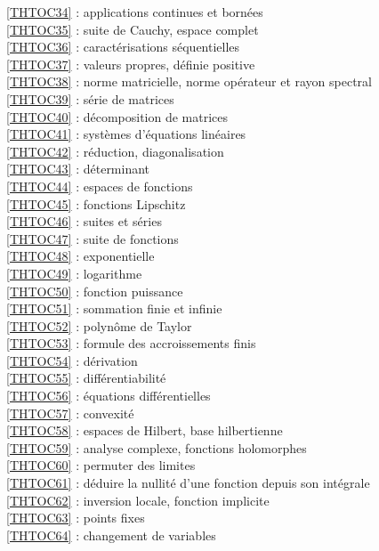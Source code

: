 \ref {THTOC34} : applications continues et bornées\\
\ref {THTOC35} : suite de Cauchy, espace complet\\
\ref {THTOC36} : caractérisations séquentielles\\
\ref {THTOC37} : valeurs propres, définie positive\\
\ref {THTOC38} : norme matricielle, norme opérateur et rayon spectral\\
\ref {THTOC39} : série de matrices\\
\ref {THTOC40} : décomposition de matrices\\
\ref {THTOC41} : systèmes d'équations linéaires\\
\ref {THTOC42} : réduction, diagonalisation\\
\ref {THTOC43} : déterminant\\
\ref {THTOC44} : espaces de fonctions\\
\ref {THTOC45} : fonctions Lipschitz\\
\ref {THTOC46} : suites et séries\\
\ref {THTOC47} : suite de fonctions\\
\ref {THTOC48} : exponentielle\\
\ref {THTOC49} : logarithme\\
\ref {THTOC50} : fonction puissance\\
\ref {THTOC51} : sommation finie et infinie\\
\ref {THTOC52} : polynôme de Taylor\\
\ref {THTOC53} : formule des accroissements finis\\
\ref {THTOC54} : dérivation\\
\ref {THTOC55} : différentiabilité\\
\ref {THTOC56} : équations différentielles\\
\ref {THTOC57} : convexité\\
\ref {THTOC58} : espaces de Hilbert, base hilbertienne\\
\ref {THTOC59} : analyse complexe, fonctions holomorphes\\
\ref {THTOC60} : permuter des limites\\
\ref {THTOC61} : déduire la nullité d'une fonction depuis son intégrale\\
\ref {THTOC62} : inversion locale, fonction implicite\\
\ref {THTOC63} : points fixes\\
\ref {THTOC64} : changement de variables\\
